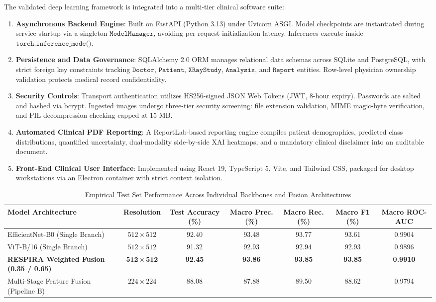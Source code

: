 \documentclass[journal]{IEEEtran}
\begin{document}
The validated deep learning framework is integrated into a multi-tier clinical software suite:
\begin{enumerate}
    \item \textbf{Asynchronous Backend Engine}: Built on FastAPI (Python 3.13) under Uvicorn ASGI. Model checkpoints are instantiated during service startup via a singleton $\texttt{ModelManager}$, avoiding per-request initialization latency. Inferences execute inside $\texttt{torch.inference\_mode()}$.
    \item \textbf{Persistence and Data Governance}: SQLAlchemy 2.0 ORM manages relational data schemas across SQLite and PostgreSQL, with strict foreign key constraints tracking $\texttt{Doctor}$, $\texttt{Patient}$, $\texttt{XRayStudy}$, $\texttt{Analysis}$, and $\texttt{Report}$ entities. Row-level physician ownership validation protects medical record confidentiality.
    \item \textbf{Security Controls}: Transport authentication utilizes HS256-signed JSON Web Tokens (JWT, 8-hour expiry). Passwords are salted and hashed via bcrypt. Ingested images undergo three-tier security screening: file extension validation, MIME magic-byte verification, and PIL decompression checking capped at 15 MB.
    \item \textbf{Automated Clinical PDF Reporting}: A ReportLab-based reporting engine compiles patient demographics, predicted class distributions, quantified uncertainty, dual-modality side-by-side XAI heatmaps, and a mandatory clinical disclaimer into an auditable document.
    \item \textbf{Front-End Clinical User Interface}: Implemented using React 19, TypeScript 5, Vite, and Tailwind CSS, packaged for desktop workstations via an Electron container with strict context isolation.
\end{enumerate}

\begin{table}[!t]
\renewcommand{\arraystretch}{1.2}
\caption{Empirical Test Set Performance Across Individual Backbones and Fusion Architectures}
\label{tab:empirical_results}
\centering
\begin{tabular}{lcccccc}
\toprule
\textbf{Model Architecture} & \textbf{Resolution} & \textbf{Test Accuracy (\%)} & \textbf{Macro Prec. (\%)} & \textbf{Macro Rec. (\%)} & \textbf{Macro F1 (\%)} & \textbf{Macro ROC-AUC} \\
\midrule
EfficientNet-B0 (Single Branch) & $512 \times 512$ & 92.40 & 93.48 & 93.77 & 93.61 & 0.9904 \\
ViT-B/16 (Single Branch) & $512 \times 512$ & 91.32 & 92.93 & 92.94 & 92.93 & 0.9896 \\
\textbf{RESPIRA Weighted Fusion (0.35 / 0.65)} & $\mathbf{512 \times 512}$ & \textbf{92.45} & \textbf{93.86} & \textbf{93.85} & \textbf{93.85} & \textbf{0.9910} \\
Multi-Stage Feature Fusion (Pipeline B) & $224 \times 224$ & 88.08 & 87.88 & 89.50 & 88.62 & 0.9794 \\
\bottomrule
\end{tabular}
\end{table}
\end{document}
